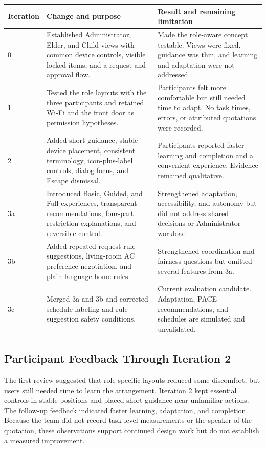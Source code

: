 \documentclass[11pt,letterpaper]{article}
\newcommand{\thead}[1]{\cellcolor{SharedNavy}\color{white}\bfseries #1}
\begin{document}
\small
{}
\begin{longtable}{P{0.55in} P{2.65in} P{3.15in}}
  \thead{Iteration} & \thead{Change and purpose} & \thead{Result and remaining limitation}\\
   & Established Administrator, Elder, and Child views with common device controls, visible locked items, and a request and approval flow. & Made the role-aware concept testable. Views were fixed, guidance was thin, and learning and adaptation were not addressed.\\
  1 & Tested the role layouts with the three participants and retained Wi-Fi and the front door as permission hypotheses. & Participants felt more comfortable but still needed time to adapt. No task times, errors, or attributed quotations were recorded.\\
  2 & Added short guidance, stable device placement, consistent terminology, icon-plus-label controls, dialog focus, and Escape dismissal. & Participants reported faster learning and completion and a convenient experience. Evidence remained qualitative.\\
  3a & Introduced Basic, Guided, and Full experiences, transparent recommendations, four-part restriction explanations, and reversible control. & Strengthened adaptation, accessibility, and autonomy but did not address shared decisions or Administrator workload.\\
  3b & Added repeated-request rule suggestions, living-room AC preference negotiation, and plain-language home rules. & Strengthened coordination and fairness questions but omitted several features from 3a.\\
  3c & Merged 3a and 3b and corrected schedule labeling and rule-suggestion safety conditions. & Current evaluation candidate. Adaptation, PACE recommendations, and schedules are simulated and unvalidated.\\
\end{longtable}
\normalsize

\subsection{Participant Feedback Through Iteration 2}

The first review suggested that role-specific layouts reduced some discomfort, but users
still needed time to learn the arrangement. Iteration 2 kept essential controls in stable
positions and placed short guidance near unfamiliar actions. The follow-up feedback indicated
faster learning, adaptation, and completion. Because the team did not record task-level
measurements or the speaker of the quotation, these observations support continued design
work but do not establish a measured improvement.
\end{document}
